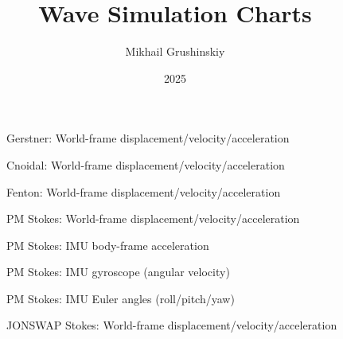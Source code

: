 \documentclass[11pt,letterpaper]{article}
\title{Wave Simulation Charts}
\author{Mikhail Grushinskiy}
\date{2025}
\begin{document}
\maketitle

\begin{figure}[H]\centering
  \resizebox{\textwidth}{!}{}
  \caption{Gerstner: World-frame displacement/velocity/acceleration}
  \label{fig:gerstner_world}
\end{figure}
\clearpage

\begin{figure}[H]\centering
  \resizebox{\textwidth}{!}{}
  \caption{Cnoidal: World-frame displacement/velocity/acceleration}
  \label{fig:cnoidal_world}
\end{figure}
\clearpage

\begin{figure}[H]\centering
  \resizebox{\textwidth}{!}{}
  \caption{Fenton: World-frame displacement/velocity/acceleration}
  \label{fig:fenton_world}
\end{figure}
\clearpage

\begin{figure}[H]\centering
  \resizebox{\textwidth}{!}{}
  \caption{PM Stokes: World-frame displacement/velocity/acceleration}
  \label{fig:pmstokes_world}
\end{figure}
\clearpage

\begin{figure}[H]\centering
  \resizebox{\textwidth}{!}{}
  \caption{PM Stokes: IMU body-frame acceleration}
  \label{fig:pmstokes_imu_acc}
\end{figure}
\clearpage

\begin{figure}[H]\centering
  \resizebox{\textwidth}{!}{}
  \caption{PM Stokes: IMU gyroscope (angular velocity)}
  \label{fig:pmstokes_imu_gyro}
\end{figure}
\clearpage

\begin{figure}[H]\centering
  \resizebox{\textwidth}{!}{}
  \caption{PM Stokes: IMU Euler angles (roll/pitch/yaw)}
  \label{fig:pmstokes_euler}
\end{figure}
\clearpage

\begin{figure}[H]\centering
  \resizebox{\textwidth}{!}{}
  \caption{JONSWAP Stokes: World-frame displacement/velocity/acceleration}
  \label{fig:jonswap_world}
\end{figure}
\clearpage
\end{document}
